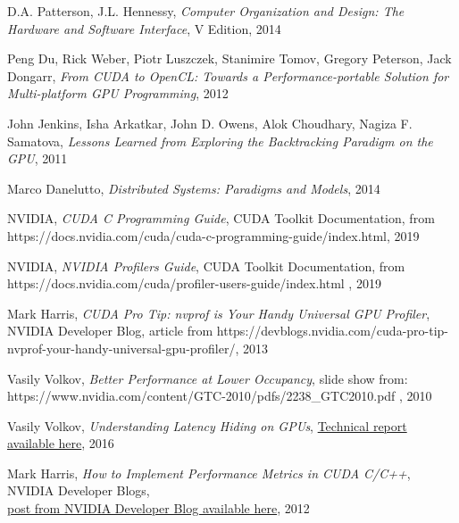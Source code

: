 \documentclass[12pt]{report}
\begin{document}
	\begin{thebibliography}{9}
		D.A. Patterson, J.L. Hennessy, 
		\textit{Computer Organization and Design: The Hardware and Software Interface}, V Edition, 2014
	
	
		Peng Du, Rick Weber, Piotr Luszczek, Stanimire Tomov, Gregory Peterson, Jack Dongarr, 
		\textit{From CUDA to OpenCL: Towards a Performance-portable Solution for Multi-platform GPU Programming}, 2012
		
		
		John Jenkins, Isha Arkatkar, John D. Owens, Alok Choudhary, Nagiza F. Samatova, 
		\textit{Lessons Learned from Exploring the Backtracking Paradigm on the GPU}, 2011
		
		
		Marco Danelutto,
		\textit{Distributed Systems: Paradigms and Models}, 2014
		
		
		NVIDIA, \textit{CUDA C Programming Guide}, CUDA Toolkit Documentation, from https://docs.nvidia.com/cuda/cuda-c-programming-guide/index.html, 2019
		
		
		NVIDIA, \textit{NVIDIA Profilers Guide}, CUDA Toolkit Documentation, from
		https://docs.nvidia.com/cuda/profiler-users-guide/index.html , 2019 
		
		
		Mark Harris, 
		\textit{CUDA Pro Tip: nvprof is Your Handy Universal GPU Profiler}, NVIDIA Developer Blog, article from https://devblogs.nvidia.com/cuda-pro-tip-nvprof-your-handy-universal-gpu-profiler/, 2013
		
		Vasily Volkov,
		\textit{Better Performance at Lower Occupancy}, slide show from: https://www.nvidia.com/content/GTC-2010/pdfs/2238\_GTC2010.pdf , 2010
		
		
		Vasily Volkov, \textit{Understanding Latency Hiding on GPUs}, \href{https://www2.eecs.berkeley.edu/Pubs/TechRpts/2016/EECS-2016-143.pdf}{Technical report available here}, 2016
		
		
		Mark Harris, \textit{How to Implement Performance Metrics in CUDA C/C++}, NVIDIA Developer Blogs,  \\
		\href{https://devblogs.nvidia.com/how-implement-performance-metrics-cuda-cc/}{post from NVIDIA Developer Blog available here}, 2012 
		

\end{thebibliography}
\end{document}
